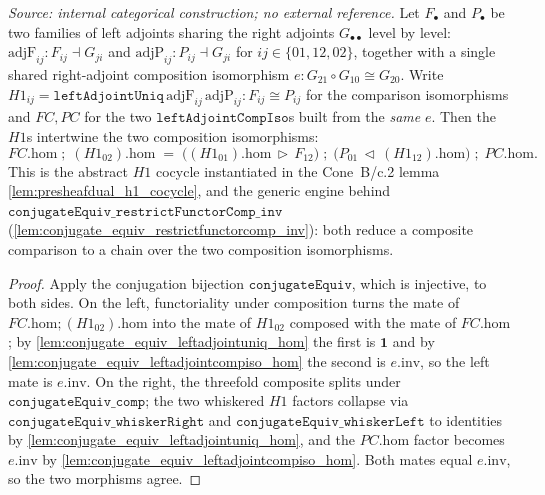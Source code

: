 \begin{lemma}\leanok
  \label{lem:leftadjointuniq_leftadjointcompiso_comm}
  \textit{Source: internal categorical construction; no external reference.}
  Let \(F_\bullet\) and \(P_\bullet\) be two families of left adjoints sharing the right adjoints
  \(G_{\bullet\bullet}\) level by level: \(\mathrm{adjF}_{ij} : F_{ij} \dashv G_{ji}\) and
  \(\mathrm{adjP}_{ij} : P_{ij} \dashv G_{ji}\) for \(ij \in \{01, 12, 02\}\), together with a single
  shared right-adjoint composition isomorphism \(e : G_{21} \circ G_{10} \cong G_{20}\). Write
  \(H1_{ij} = \mathtt{leftAdjointUniq}\,\mathrm{adjF}_{ij}\,\mathrm{adjP}_{ij} : F_{ij} \cong P_{ij}\)
  for the comparison isomorphisms and \(FC, PC\) for the two
  \(\mathtt{leftAdjointCompIso}\)s built from the \emph{same} \(e\). Then the \(H1\)s intertwine the two
  composition isomorphisms:
  \[
    FC.\mathrm{hom} \;\mathbin{;}\; (H1_{02}).\mathrm{hom}
      \;=\; \bigl((H1_{01}).\mathrm{hom} \,\triangleright\, F_{12}\bigr)
        \;\mathbin{;}\; \bigl(P_{01} \,\triangleleft\, (H1_{12}).\mathrm{hom}\bigr)
        \;\mathbin{;}\; PC.\mathrm{hom} .
  \]
  This is the abstract \(H1\) cocycle instantiated in the Cone~B/c.2 lemma
  \cref{lem:presheafdual_h1_cocycle}, and the generic engine behind
  \(\mathtt{conjugateEquiv\_restrictFunctorComp\_inv}\)
  (\cref{lem:conjugate_equiv_restrictfunctorcomp_inv}): both reduce a composite comparison to a chain
  over the two composition isomorphisms.
\end{lemma}
\begin{proof}
  \leanok
  Apply the conjugation bijection \(\mathtt{conjugateEquiv}\), which is injective, to both sides. On the
  left, functoriality under composition turns the mate of \(FC.\mathrm{hom} \mathbin{;} (H1_{02}).\mathrm{hom}\)
  into the mate of \(H1_{02}\) composed with the mate of \(FC.\mathrm{hom}\); by
  \cref{lem:conjugate_equiv_leftadjointuniq_hom} the first is \(\mathbf{1}\) and by
  \cref{lem:conjugate_equiv_leftadjointcompiso_hom} the second is \(e.\mathrm{inv}\), so the left mate is
  \(e.\mathrm{inv}\). On the right, the threefold composite splits under
  \(\mathtt{conjugateEquiv\_comp}\); the two whiskered \(H1\) factors collapse via
  \(\mathtt{conjugateEquiv\_whiskerRight}\) and \(\mathtt{conjugateEquiv\_whiskerLeft}\) to identities by
  \cref{lem:conjugate_equiv_leftadjointuniq_hom}, and the \(PC.\mathrm{hom}\) factor becomes
  \(e.\mathrm{inv}\) by \cref{lem:conjugate_equiv_leftadjointcompiso_hom}. Both mates equal \(e.\mathrm{inv}\),
  so the two morphisms agree.
\end{proof}

